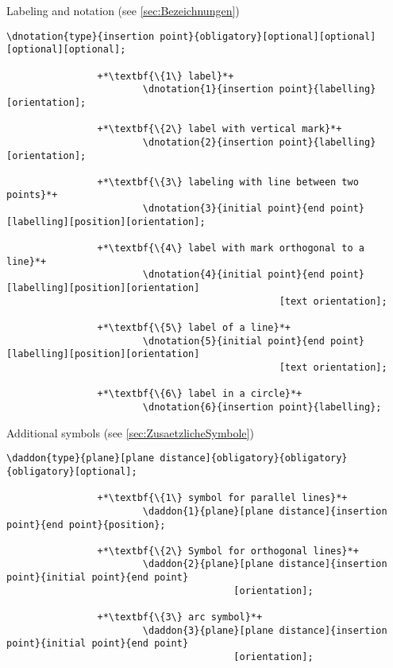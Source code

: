 \documentclass[%
  a4paper,
  BCOR20mm,
  pointlessnumbers,
  twoside,
  halfparskip,
  openright,
]{scrreprt}
\begin{document}
Labeling and notation (see \ref{sec:Bezeichnungen})

\begin{lstlisting}[emph={dnotation},backgroundcolor=\color{white}]
		\dnotation{type}{insertion point}{obligatory}[optional][optional][optional][optional];
		
				+*\textbf{\{1\} label}*+
						\dnotation{1}{insertion point}{labelling}[orientation];
						
				+*\textbf{\{2\} label with vertical mark}*+
						\dnotation{2}{insertion point}{labelling}[orientation];
						
				+*\textbf{\{3\} labeling with line between two points}*+
						\dnotation{3}{initial point}{end point}[labelling][position][orientation];
						
				+*\textbf{\{4\} label with mark orthogonal to a line}*+
						\dnotation{4}{initial point}{end point}[labelling][position][orientation]
												[text orientation];
						
				+*\textbf{\{5\} label of a line}*+
						\dnotation{5}{initial point}{end point}[labelling][position][orientation]
												[text orientation];
						
				+*\textbf{\{6\} label in a circle}*+
						\dnotation{6}{insertion point}{labelling};
\end{lstlisting}\vspace{-10mm}

Additional symbols (see \ref{sec:ZusaetzlicheSymbole})

\begin{lstlisting}[emph={daddon},backgroundcolor=\color{white}]
		\daddon{type}{plane}[plane distance]{obligatory}{obligatory}{obligatory}[optional];
		
				+*\textbf{\{1\} symbol for parallel lines}*+
						\daddon{1}{plane}[plane distance]{insertion point}{end point}{position};
						
				+*\textbf{\{2\} Symbol for orthogonal lines}*+
						\daddon{2}{plane}[plane distance]{insertion point}{initial point}{end point}
										[orientation];
				
				+*\textbf{\{3\} arc symbol}*+
						\daddon{3}{plane}[plane distance]{insertion point}{initial point}{end point}
										[orientation];
\end{lstlisting}\vspace{-10mm}

\end{document}
